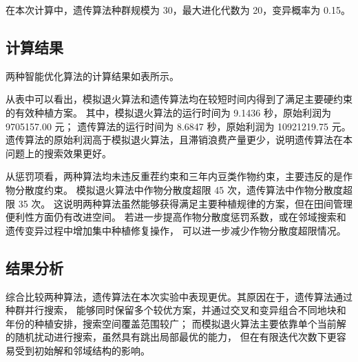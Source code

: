 \documentclass[12pt,a4paper]{ctexart}
\begin{document}
在本次计算中，遗传算法种群规模为 30，最大进化代数为 20，变异概率为 0.15。

\subsection{计算结果}

两种智能优化算法的计算结果如表所示。

\begin{table}[htbp]
\centering
\caption{原始模型下两种智能优化算法的计算结果}
\label{tab:sa-ga-result}
\small
\setlength{\tabcolsep}{3pt}
\end{table}

从表中可以看出，模拟退火算法和遗传算法均在较短时间内得到了满足主要硬约束的有效种植方案。
其中，模拟退火算法的运行时间为 9.1436 秒，原始利润为 9705157.00 元；
遗传算法的运行时间为 8.6847 秒，原始利润为 10921219.75 元。
遗传算法的原始利润高于模拟退火算法，且滞销浪费产量更少，说明遗传算法在本问题上的搜索效果更好。

从惩罚项看，两种算法均未违反重茬约束和三年内豆类作物约束，主要违反的是作物分散度约束。
模拟退火算法中作物分散度超限 45 次，遗传算法中作物分散度超限 35 次。
这说明两种算法虽然能够获得满足主要种植规律的方案，但在田间管理便利性方面仍有改进空间。
若进一步提高作物分散度惩罚系数，或在邻域搜索和遗传变异过程中增加集中种植修复操作，
可以进一步减少作物分散度超限情况。

\subsection{结果分析}

综合比较两种算法，遗传算法在本次实验中表现更优。其原因在于，遗传算法通过种群并行搜索，
能够同时保留多个较优方案，并通过交叉和变异组合不同地块和年份的种植安排，搜索空间覆盖范围较广；
而模拟退火算法主要依靠单个当前解的随机扰动进行搜索，虽然具有跳出局部最优的能力，
但在有限迭代次数下更容易受到初始解和邻域结构的影响。
\end{document}
